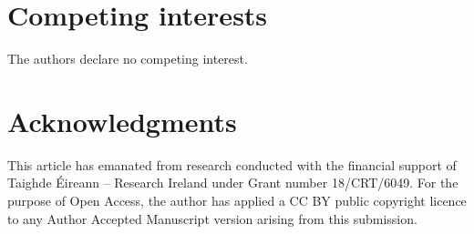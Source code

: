 \documentclass[webpdf,large,contemporary,namedate]{oup-authoring-template}
\theoremstyle{thmstyleone}
\theoremstyle{thmstyletwo}
\theoremstyle{thmstylethree}
\begin{document}
\section{Competing interests}

The authors declare no competing interest.


\section{Acknowledgments}

This article has emanated from research conducted with the financial
support of Taighde Éireann -- Research Ireland under Grant number
18/CRT/6049. For the purpose of Open Access, the author has applied a CC
BY public copyright licence to any Author Accepted Manuscript version
arising from this submission.
\renewcommand\refname{References}




\end{document}
